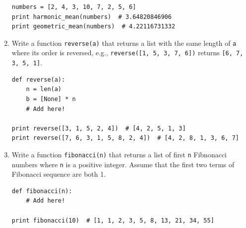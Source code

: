 \documentclass[../main.tex]{subfiles}
\begin{document}
\begin{enumerate}
\begin{verbatim}
numbers = [2, 4, 3, 10, 7, 2, 5, 6]
print harmonic_mean(numbers)  # 3.64820846906
print geometric_mean(numbers)  # 4.22116731332
\end{verbatim}

\item Write a function \texttt{reverse(a)} that returns a list with the same length of \texttt{a} where its order is reversed, e.g., \texttt{reverse([1, 5, 3, 7, 6])} returns \texttt{[6, 7, 3, 5, 1]}.
\begin{verbatim}
def reverse(a):
    n = len(a)
    b = [None] * n
    # Add here!

print reverse([3, 1, 5, 2, 4])  # [4, 2, 5, 1, 3]
print reverse([7, 6, 3, 1, 5, 8, 2, 4])  # [4, 2, 8, 1, 3, 6, 7]
\end{verbatim}

\item Write a function \texttt{fibonacci(n)} that returns a list of first \texttt{n} Fibnonacci numbers where \texttt{n} is a positive integer.
Assume that the first two terms of Fibonacci sequence are both 1.
\begin{verbatim}
def fibonacci(n):
    # Add here!

print fibonacci(10)  # [1, 1, 2, 3, 5, 8, 13, 21, 34, 55]
\end{verbatim}


\end{enumerate}
\end{document}
